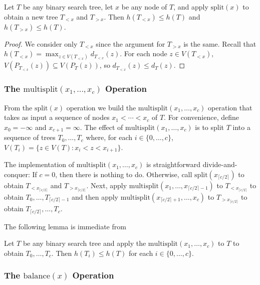 \documentclass[kpfonts]{patmorin}
\begin{document}
\begin{lem}
  Let $T$ be any binary search tree, let $x$ be any node of $T$, and apply $\mathrm{split}(x)$ to obtain a new tree $T_{<x}$ and $T_{>x}$.  
  Then $h(T_{<x})\le h(T)$ and $h(T_{>x})\le h(T)$.
\end{lem}

\begin{proof}
  We consider only $T_{<x}$ since the argument for $T_{>x}$ is the same.
  Recall that $h(T_{<x})=\max_{z\in V(T_{<x})} d_{T_{<x}}(z)$.  For each node $z\in V(T_{<x})$, $V(P_{T_{<x}}(z))\subseteq V(P_T(z))$, so $d_{T_{<x}}(z)\le d_T(z)$.
\end{proof}

\subsubsection{The $\textrm{multisplit}(x_1,\ldots,x_c)$ Operation}

From the $\mathrm{split}(x)$ operation we build the $\textrm{multisplit}(x_1,\ldots,x_c)$ operation that takes as input a sequence of nodes $x_1<\cdots<x_c$ of $T$.  For convenience, define $x_0=-\infty$ and $x_{c+1}=\infty$.  The effect of $\textrm{multisplit}(x_1,\ldots,x_c)$ is to split $T$ into a sequence of trees $T_0,\ldots,T_{c}$ where, for each $i\in\{0,\ldots,c\}$, $V(T_i)=\{z\in V(T): x_i< z<x_{i+1}\}$.

The implementation of $\textrm{multisplit}(x_1,\ldots,x_c)$ is straightforward divide-and-conquer:  If $c=0$, then there is nothing to do.  Otherwise, call $\mathrm{split}(x_{\lceil c/2\rceil})$ to obtain $T_{<x_{\lceil c/2\rceil}}$ and $T_{>x_{\lceil c/2\rceil}}$.  Next, apply $\textrm{multisplit}(x_1,\ldots,x_{\lceil c/2\rceil-1})$ to $T_{<x_{\lceil c/2\rceil}}$ to obtain $T_0,\ldots,T_{\lceil c/2\rceil-1}$ and then apply $\textrm{multisplit}(x_{\lceil c/2\rceil+1},\ldots,x_c)$ to $T_{>x_{\lceil c/2\rceil}}$ to obtain $T_{\lceil c/2\rceil},\ldots,T_c$.

The following lemma is immediate from  
\begin{lem}
  Let $T$ be any binary search tree and apply the $\textrm{multisplit}(x_1,\ldots,x_c)$ to $T$ to obtain $T_0,\ldots,T_c$.  Then $h(T_i)\le h(T)$ for each $i\in\{0,\ldots,c\}$.
\end{lem}

\subsubsection{The $\mathrm{balance}(x)$ Operation}
\end{document}
